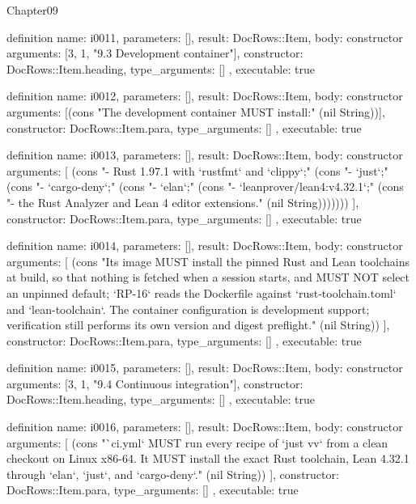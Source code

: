 \begin{lexlean}{Chapter09}
\begin{semanticmodule}
definition{
  name: i0011,
  parameters: [],
  result: DocRows::Item,
  body: constructor{
    arguments: [3, 1, "9.3 Development container"],
    constructor: DocRows::Item.heading,
    type_arguments: []
  },
  executable: true
}

definition{
  name: i0012,
  parameters: [],
  result: DocRows::Item,
  body: constructor{
    arguments: [(cons "The development container MUST install:" (nil String))],
    constructor: DocRows::Item.para,
    type_arguments: []
  },
  executable: true
}

definition{
  name: i0013,
  parameters: [],
  result: DocRows::Item,
  body: constructor{
    arguments: [
      (cons "- Rust 1.97.1 with `rustfmt` and `clippy`;" (cons "- `just`;" (cons "- `cargo-deny`;" (cons "- `elan`;" (cons "- `leanprover/lean4:v4.32.1`;" (cons "- the Rust Analyzer and Lean 4 editor extensions." (nil String)))))))
    ],
    constructor: DocRows::Item.para,
    type_arguments: []
  },
  executable: true
}

definition{
  name: i0014,
  parameters: [],
  result: DocRows::Item,
  body: constructor{
    arguments: [
      (cons "Its image MUST install the pinned Rust and Lean toolchains at build, so that nothing is fetched when a session starts, and MUST NOT select an unpinned default; `RP-16` reads the Dockerfile against `rust-toolchain.toml` and `lean-toolchain`. The container configuration is development support; verification still performs its own version and digest preflight." (nil String))
    ],
    constructor: DocRows::Item.para,
    type_arguments: []
  },
  executable: true
}

definition{
  name: i0015,
  parameters: [],
  result: DocRows::Item,
  body: constructor{
    arguments: [3, 1, "9.4 Continuous integration"],
    constructor: DocRows::Item.heading,
    type_arguments: []
  },
  executable: true
}

definition{
  name: i0016,
  parameters: [],
  result: DocRows::Item,
  body: constructor{
    arguments: [
      (cons "`ci.yml` MUST run every recipe of `just vv` from a clean checkout on Linux x86-64. It MUST install the exact Rust toolchain, Lean 4.32.1 through `elan`, `just`, and `cargo-deny`." (nil String))
    ],
    constructor: DocRows::Item.para,
    type_arguments: []
  },
  executable: true
}


\end{semanticmodule}
\end{lexlean}
